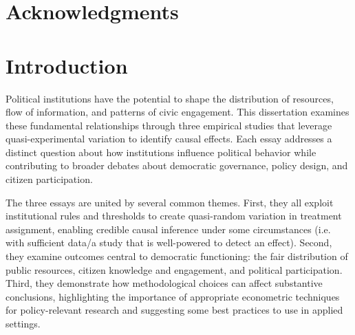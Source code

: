 \documentclass[12pt,letterpaper,oneside]{book}
\begin{document}
\chapter*{Acknowledgments}


\begingroup
\singlespacing
\tableofcontents
\endgroup

\clearpage
{}
{}
\begingroup
\singlespacing
\listoftables
\endgroup

\clearpage
{}
{}
\begingroup
\singlespacing
\listoffigures
\endgroup


\mainmatter
\pagestyle{fancy}
\doublespacing


\chapter*{Introduction}

Political institutions have the potential to shape the distribution of resources, flow of information, and patterns of civic engagement. This dissertation examines these fundamental relationships through three empirical studies that leverage quasi-experimental variation to identify causal effects. Each essay addresses a distinct question about how institutions influence political behavior while contributing to broader debates about democratic governance, policy design, and citizen participation.

The three essays are united by several common themes. First, they all exploit institutional rules and thresholds to create quasi-random variation in treatment assignment, enabling credible causal inference under some circumstances (i.e. with sufficient data/a study that is well-powered to detect an effect). Second, they examine outcomes central to democratic functioning: the fair distribution of public resources, citizen knowledge and engagement, and political participation. Third, they demonstrate how methodological choices can  affect substantive conclusions, highlighting the importance of appropriate econometric techniques for policy-relevant research and suggesting some best practices to use in applied settings.
\end{document}
